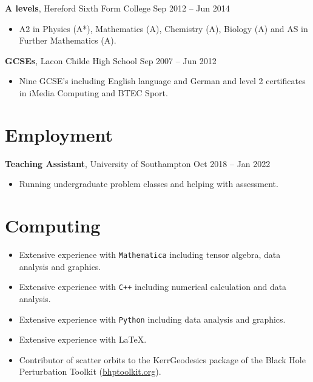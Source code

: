 \documentclass[10.5pt, oneside]{article}   	%
\begin{document}
\textbf{A levels}, Hereford Sixth Form College \hfill Sep 2012 -- Jun 2014 \\
\vspace{-5mm}
\begin{itemize}
\item A2 in Physics (A*), Mathematics (A), Chemistry (A), Biology (A) and AS in Further Mathematics (A).
\end{itemize} 

\textbf{GCSEs}, Lacon Childe High School \hfill Sep 2007 -- Jun 2012\\
\vspace{-5mm}
\begin{itemize}
\item Nine GCSE's including English language and German and level 2 certificates in iMedia Computing and BTEC Sport.
\end{itemize} 
 
 \section*{Employment}
{\bf Teaching Assistant}, University of Southampton \hspace{\fill} Oct 2018 -- Jan 2022 \\
\vspace{-5mm}
\begin{itemize}
\item Running undergraduate problem classes and helping with assessment.
\end{itemize}

 \section*{Computing}
 \begin{itemize}
\item Extensive experience with \texttt{Mathematica} including tensor algebra, data analysis and graphics. 
\item Extensive experience with \texttt{C++} including numerical calculation and data analysis.
\item Extensive experience with \texttt{Python} including data analysis and graphics. 
\item Extensive experience with \LaTeX.
\item Contributor of scatter orbits to the KerrGeodesics package of the Black Hole Perturbation Toolkit (\href{http://bhptoolkit.org/}{bhptoolkit.org}).
\end{itemize}
 
\end{document}

